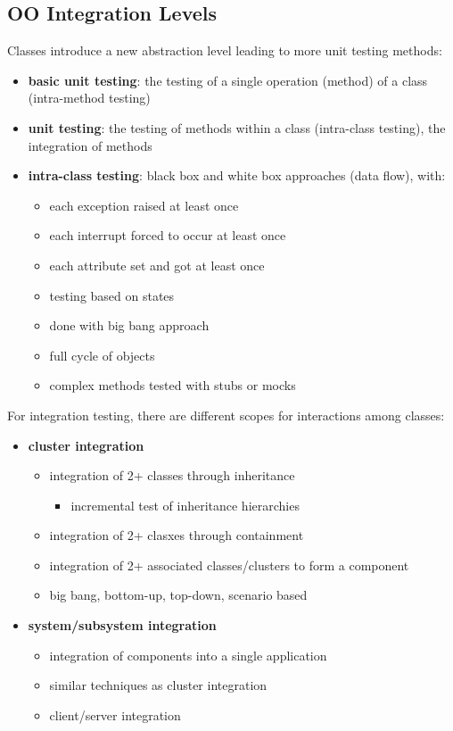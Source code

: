 \documentclass[11pt]{article}
\begin{document}
\subsection{OO Integration Levels}
\label{sec:org02abd75}
Classes introduce a new abstraction level leading to more unit testing methods:
\begin{itemize}
\item \textbf{basic unit testing}: the testing of a single operation (method)
of a class (intra-method testing)
\item \textbf{unit testing}: the testing of methods within a class (intra-class testing),
the integration of methods
\item \textbf{intra-class testing}: black box and white box approaches (data flow), with:
\begin{itemize}
\item each exception raised at least once
\item each interrupt forced to occur at least once
\item each attribute set and got at least once
\item testing based on states
\item done with big bang approach
\item full cycle of objects
\item complex methods tested with stubs or mocks
\end{itemize}
\end{itemize}

For integration testing, there are different scopes for interactions among
classes:
\begin{itemize}
\item \textbf{cluster integration}
\begin{itemize}
\item integration of 2+ classes through inheritance
\begin{itemize}
\item incremental test of inheritance hierarchies
\end{itemize}
\item integration of 2+ clasxes through containment
\item integration of 2+ associated classes/clusters to form a component
\item big bang, bottom-up, top-down, scenario based
\end{itemize}
\item \textbf{system/subsystem integration}
\begin{itemize}
\item integration of components into a single application
\item similar techniques as cluster integration
\item client/server integration
\end{itemize}
\end{itemize}
\end{document}
